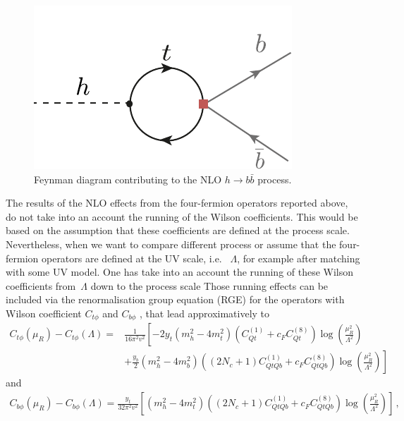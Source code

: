 \begin{figure}[h!]
	\centering
	\includegraphics[scale=0.8]{./figures/Hbb}
	\caption{Feynman diagram contributing to the NLO   $h \to b \bar b$ process. }
	\label{hbb}
\end{figure}
The results of the NLO effects from the four-fermion operators reported above, do not take into an account the running of the Wilson coefficients. This would be based on the assumption that these coefficients are defined at the process scale. Nevertheless, when we want to compare different process or assume that the four-fermion operators are defined at the UV scale, i.e. ~$\Lambda$, for example after matching with some UV model. One has take into an account the running of these Wilson coefficients from~$\Lambda$ down to the process scale
Those running effects can be included via the renormalisation group equation (RGE) for the operators with Wilson coefficient $C_{t\phi}$  and $C_{b\phi}$  \cite{Jenkins:2013zja, Jenkins:2013wua}, that lead approximatively to 
\begin{equation}
	\begin{split}
			C_{t\phi}(\mu_R)-C_{t\phi}(\Lambda)= &\frac{1}{16 \pi^2 v^2} \left[-2  y_t (m_h^2  -4 m_t^2) (C_{Qt}^{(1)}+c_F C_{Qt}^{(8)} )\log\left( \frac{\mu_R^2}{\Lambda^2}\right) \right.\\
			& \left.+ \frac{y_b}{2} (m_h^2-4 m_b^2)\left(  (2N_c+1)  C_{QtQb}^{(1)}+   c_F C_{QtQb}^{(8)}\right)\log\left( \frac{\mu_R^2}{\Lambda^2}\right)\right] \label{eq:runningCuH}
		\end{split}
\end{equation}
and
\begin{equation}
	\begin{split}
			C_{b\phi}(\mu_R)-C_{b\phi}(\Lambda)= \frac{y_t}{32 \pi^2 v^2} \left[  (m_h^2-4 m_t^2)\left(  (2N_c+1)  C_{QtQb}^{(1)}+   c_F C_{QtQb}^{(8)}\right)\log\left( \frac{\mu_R^2}{\Lambda^2}\right)\right]\,, \label{eq:runningCdH}
		\end{split}
\end{equation}
